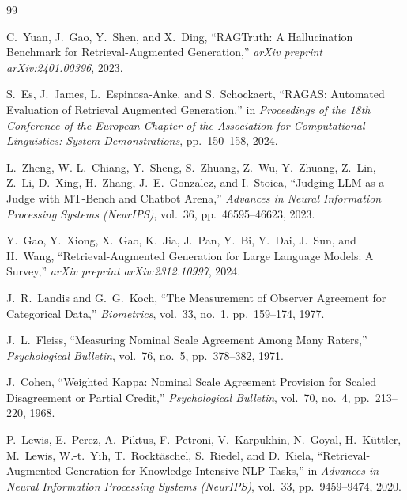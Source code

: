\documentclass[11pt,a4paper]{article}
\begin{document}
\vspace{0.4cm}
{}
\begin{thebibliography}{99}

C.~Yuan, J.~Gao, Y.~Shen, and X.~Ding, ``RAGTruth: A Hallucination Benchmark for Retrieval-Augmented Generation,'' \textit{arXiv preprint arXiv:2401.00396}, 2023.

S.~Es, J.~James, L.~Espinosa-Anke, and S.~Schockaert, ``RAGAS: Automated Evaluation of Retrieval Augmented Generation,'' in \textit{Proceedings of the 18th Conference of the European Chapter of the Association for Computational Linguistics: System Demonstrations}, pp.~150--158, 2024.

L.~Zheng, W.-L.~Chiang, Y.~Sheng, S.~Zhuang, Z.~Wu, Y.~Zhuang, Z.~Lin, Z.~Li, D.~Xing, H.~Zhang, J.~E.~Gonzalez, and I.~Stoica, ``Judging LLM-as-a-Judge with MT-Bench and Chatbot Arena,'' \textit{Advances in Neural Information Processing Systems (NeurIPS)}, vol.~36, pp.~46595--46623, 2023.

Y.~Gao, Y.~Xiong, X.~Gao, K.~Jia, J.~Pan, Y.~Bi, Y.~Dai, J.~Sun, and H.~Wang, ``Retrieval-Augmented Generation for Large Language Models: A Survey,'' \textit{arXiv preprint arXiv:2312.10997}, 2024.

J.~R.~Landis and G.~G.~Koch, ``The Measurement of Observer Agreement for Categorical Data,'' \textit{Biometrics}, vol.~33, no.~1, pp.~159--174, 1977.

J.~L.~Fleiss, ``Measuring Nominal Scale Agreement Among Many Raters,'' \textit{Psychological Bulletin}, vol.~76, no.~5, pp.~378--382, 1971.

J.~Cohen, ``Weighted Kappa: Nominal Scale Agreement Provision for Scaled Disagreement or Partial Credit,'' \textit{Psychological Bulletin}, vol.~70, no.~4, pp.~213--220, 1968.

P.~Lewis, E.~Perez, A.~Piktus, F.~Petroni, V.~Karpukhin, N.~Goyal, H.~K\"{u}ttler, M.~Lewis, W.-t.~Yih, T.~Rockt\"{a}schel, S.~Riedel, and D.~Kiela, ``Retrieval-Augmented Generation for Knowledge-Intensive NLP Tasks,'' in \textit{Advances in Neural Information Processing Systems (NeurIPS)}, vol.~33, pp.~9459--9474, 2020.

\end{thebibliography}
\end{document}
